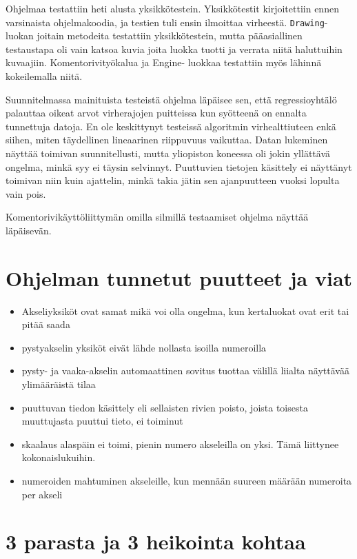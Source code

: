 \documentclass{article}
\begin{document}
    Ohjelmaa testattiin heti alusta yksikkötestein. Yksikkötestit kirjoitettiin ennen varsinaista 
	ohjelmakoodia, ja testien tuli ensin ilmoittaa virheestä. \texttt{Drawing}-luokan joitain
	metodeita testattiin yksikkötestein, 
	mutta pääasiallinen testaustapa oli vain katsoa kuvia
	joita luokka tuotti ja verrata niitä haluttuihin kuvaajiin. Komentorivityökalua ja Engine-
	luokkaa testattiin myös lähinnä kokeilemalla niitä. 
	
	Suunnitelmassa mainituista testeistä ohjelma läpäisee sen, että regressioyhtälö
	palauttaa oikeat arvot virherajojen puitteissa kun syötteenä on ennalta tunnettuja
	datoja. En ole keskittynyt testeissä algoritmin virhealttiuteen enkä siihen, miten
	täydellinen lineaarinen riippuvuus vaikuttaa. Datan lukeminen näyttää toimivan
	suunnitellusti, mutta yliopiston koneessa oli jokin yllättävä ongelma, minkä syy
	ei täysin selvinnyt. Puuttuvien tietojen käsittely ei näyttänyt toimivan niin
	kuin ajattelin, minkä takia jätin sen ajanpuutteen vuoksi lopulta vain pois.
	
	Komentorivikäyttöliittymän omilla silmillä testaamiset ohjelma näyttää läpäisevän.

\section{Ohjelman tunnetut puutteet ja viat}

	\begin{itemize}
		\item Akseliyksiköt ovat samat mikä voi olla ongelma, kun kertaluokat ovat erit tai pitää saada
		\item pystyakselin yksiköt eivät lähde nollasta isoilla numeroilla
		\item pysty- ja vaaka-akselin automaattinen sovitus tuottaa välillä liialta näyttävää ylimääräistä
	  tilaa
		\item puuttuvan tiedon käsittely eli sellaisten rivien poisto, joista toisesta muuttujasta
	  puuttui tieto, ei toiminut
		\item skaalaus alaspäin ei toimi, pienin numero akseleilla on yksi. Tämä liittynee kokonaislukuihin.
		\item numeroiden mahtuminen akseleille, kun mennään suureen määrään numeroita per akseli
	\end{itemize}
	
\section{3 parasta ja 3 heikointa kohtaa}     
\end{document}
